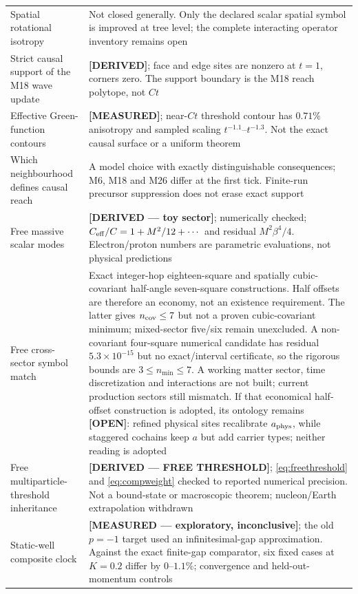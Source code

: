 \documentclass[11pt,a4paper]{article}
\theoremstyle{definition}
\theoremstyle{plain}
\theoremstyle{remark}
\begin{document}
{\begin{longtable}{p{} p{}}
Spatial rotational isotropy & Not closed generally. Only the declared
scalar spatial symbol is improved at tree level; the complete interacting
operator inventory remains open \\
Strict causal support of the M18 wave update & \textbf{[DERIVED]}; face and
edge sites are nonzero at $t=1$, corners zero. The support boundary is the
M18 reach polytope, not $Ct$ \\
Effective Green-function contours & \textbf{[MEASURED]}; near-$Ct$
threshold contour has $0.71\%$ anisotropy and sampled scaling
$t^{-1.1}$--$t^{-1.3}$. Not the exact causal surface or a uniform theorem
\\
Which neighbourhood defines causal reach & A model choice with exactly
distinguishable consequences; M6, M18 and M26 differ at the first tick.
Finite-run precursor suppression does not erase exact support \\
Free massive scalar modes & \textbf{[DERIVED --- toy sector]}; numerically
checked;
$C_{\rm eff}/C=1+M^2/12+\cdots$ and residual
$M^2\beta^4/4$. Electron/proton numbers are parametric evaluations, not
physical predictions \\
Free cross-sector symbol match & Exact integer-hop eighteen-square and
spatially cubic-covariant half-angle seven-square constructions. Half
offsets are therefore an economy, not an existence requirement. The latter
gives $n_{\rm cov}\le7$ but not a proven cubic-covariant minimum;
mixed-sector five/six remain unexcluded. A non-covariant four-square
numerical candidate has residual $5.3\times10^{-15}$ but no exact/interval
certificate, so the rigorous bounds are $3\le n_{\min}\le7$. A working matter sector, time discretization and
interactions are not built; current production sectors still mismatch.
If that economical half-offset construction is adopted, its ontology
remains \textbf{[OPEN]}: refined physical sites
recalibrate $a_{\rm phys}$, while staggered cochains keep $a$ but add
carrier types; neither reading is adopted \\
Free multiparticle-threshold inheritance & \textbf{[DERIVED --- FREE
THRESHOLD]}; \eqref{eq:freethreshold} and \eqref{eq:compweight} checked to
reported numerical precision. Not a bound-state or macroscopic theorem;
nucleon/Earth extrapolation withdrawn \\
Static-well composite clock & \textbf{[MEASURED --- exploratory,
inconclusive]}; the old $p=-1$ target used an infinitesimal-gap
approximation. Against the exact finite-gap comparator, six fixed cases at
$K=0.2$ differ by $0$--$1.1\%$; convergence and held-out-momentum controls

\end{longtable}}
\end{document}
